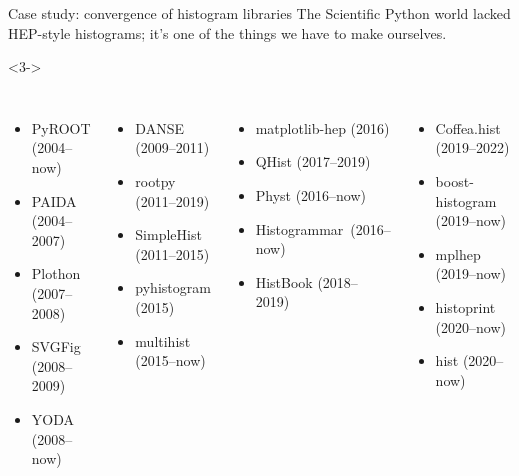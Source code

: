 \begin{frame}{Case study: convergence of histogram libraries}
\vspace{0.5 cm}
The Scientific Python world lacked HEP-style histograms; it's one of the things we have to make ourselves.

\vspace{0.5 cm}

\vspace{0.5 cm}

\vspace{0.5 cm}
\begin{uncoverenv}<3->
\begin{columns}
\scriptsize
{}
\begin{itemize}
\item PyROOT (2004--now)
\item PAIDA (2004--2007)
\item Plothon (2007--2008)
\item SVGFig (2008--2009)
\item YODA (2008--now)
\end{itemize}

\begin{itemize}
\item DANSE (2009--2011)
\item rootpy (2011--2019)
\item SimpleHist (2011--2015)
\item pyhistogram (2015)
\item multihist (2015--now)
\end{itemize}

\begin{itemize}
\item matplotlib-hep (2016)
\item QHist (2017--2019)
\item Physt (2016--now)
\item \mbox{Histogrammar (2016--now)\hspace{-0.2 cm}}
\item HistBook (2018--2019)
\end{itemize}

\begin{itemize}
\item Coffea.hist (2019--2022)
\item boost-histogram (2019--now)
\item mplhep (2019--now)
\item histoprint (2020--now)
\item hist (2020--now)
\end{itemize}

\end{columns}
\end{uncoverenv}
\end{frame}

